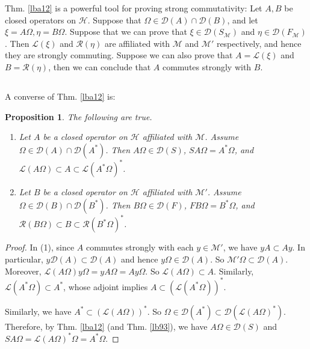 \documentclass[12pt,b5paper,notitlepage]{article}
\theoremstyle{definition}
\theoremstyle{plain}
\newtheorem{pp}[df]{Proposition}
\newcommand{\mc}{\mathcal}
\newcommand{\Dom}{\scr{D}}
\newcommand{\scr}{\mathscr}
\numberwithin{equation}{section}
\begin{document}
Thm. \ref{lba12} is a powerful tool for proving strong commutativity: Let $A,B$ be closed operators on $\mc H$. Suppose that $\Omega\in\Dom(A)\cap\Dom(B)$, and let $\xi=A\Omega,\eta=B\Omega$. Suppose that we can prove that $\xi\in\Dom(S_{\mc M})$ and $\eta\in\Dom(F_{\mc M})$. Then $\scr L(\xi)$ and $\scr R(\eta)$ are affiliated with $\mc M$ and $\mc M'$ respectively, and hence they are strongly commuting. Suppose we can also prove that $A=\scr L(\xi)$ and $B=\scr R(\eta)$, then we can conclude that $A$ commutes strongly with $B$.




\subsection{}



A converse of Thm. \ref{lba12} is:

\begin{pp}\label{lba14}
The following are true.
\begin{enumerate}
\item[(1)] Let $A$ be a closed operator on $\mc H$ affiliated with $\mathcal M$. Assume $\Omega\in\Dom(A)\cap\Dom(A^*)$. Then $A\Omega\in\Dom(S)$, $SA\Omega=A^*\Omega$, and $\scr L(A\Omega)\subset A\subset \scr L(A^*\Omega)^*$.
\item[(2)] Let $B$ be a closed operator on $\mc H$ affiliated with $\mathcal M'$. Assume $\Omega\in\Dom(B)\cap\Dom(B^*)$. Then $B\Omega\in\Dom(F)$, $FB\Omega=B^*\Omega$, and $\scr R(B\Omega)\subset B\subset \scr R(B^*\Omega)^*$.
\end{enumerate}
\end{pp}


\begin{proof}
In (1), since $A$ commutes strongly with each $y\in\mc M'$, we have $yA\subset Ay$. In particular, $y\Dom(A)\subset \Dom(A)$ and hence $y\Omega\in\Dom(A)$. So $\mc M'\Omega\subset\Dom(A)$. Moreover, $\scr L(A\Omega)y\Omega=yA\Omega=Ay\Omega$. So $\scr L(A\Omega)\subset A$. Similarly, $\scr L(A^*\Omega)\subset A^*$, whose adjoint implies $A\subset(\scr L(A^*\Omega))^*$. 


Similarly, we have $A^*\subset(\scr L(A\Omega))^*$. So $\Omega\in\Dom(A^*)\subset\Dom(\scr L(A\Omega)^*)$. Therefore, by Thm. \ref{lba12} (and Thm. \ref{lb93}), we have $A\Omega\in\Dom(S)$ and $SA\Omega=\scr L(A\Omega)^*\Omega=A^*\Omega$.
\end{proof}


\subsection{}
\end{document}
